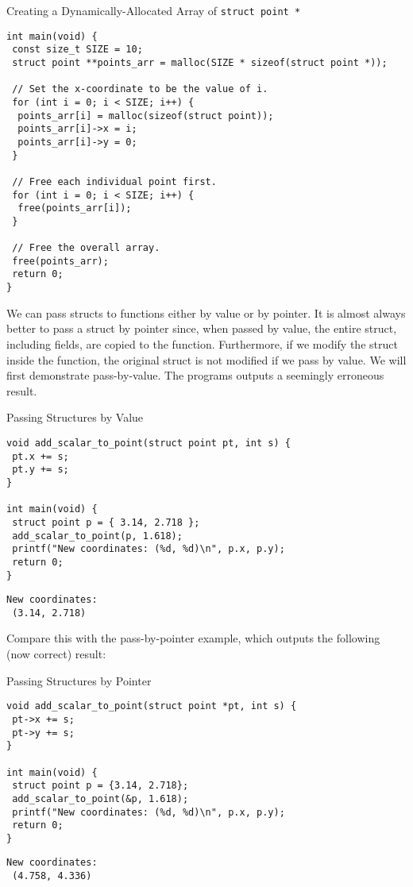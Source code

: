 \begin{cl}[main.c]{Creating a Dynamically-Allocated Array of \texttt{struct point *}}\begin{lstlisting}[language=MyC]
int main(void) {
 const size_t SIZE = 10;
 struct point **points_arr = malloc(SIZE * sizeof(struct point *));

 // Set the x-coordinate to be the value of i.
 for (int i = 0; i < SIZE; i++) {
  points_arr[i] = malloc(sizeof(struct point));
  points_arr[i]->x = i;
  points_arr[i]->y = 0;
 }
    
 // Free each individual point first.
 for (int i = 0; i < SIZE; i++) {
  free(points_arr[i]);
 }
    
 // Free the overall array.
 free(points_arr);
 return 0;
}
\end{lstlisting}\end{cl}

We can pass structs to functions either by value or by pointer. It is almost always better to pass a struct by pointer since, when passed by value, the entire struct, including fields, are copied to the function. Furthermore, if we modify the struct inside the function, the original struct is not modified if we pass by value. We will first demonstrate pass-by-value. The programs outputs a seemingly erroneous result.

\begin{clo}[main.c]{Passing Structures by Value}\begin{lstlisting}[language=MyC]
void add_scalar_to_point(struct point pt, int s) {
 pt.x += s;
 pt.y += s;
}

int main(void) {
 struct point p = { 3.14, 2.718 };
 add_scalar_to_point(p, 1.618);
 printf("New coordinates: (%d, %d)\n", p.x, p.y);
 return 0;
}
\end{lstlisting}
\tcblower
\begin{lstlisting}[language=MyOutput]
New coordinates: 
 (3.14, 2.718)
\end{lstlisting}
\end{clo}

Compare this with the pass-by-pointer example, which outputs the following (now correct) result:

\begin{clo}[main.c]{Passing Structures by Pointer}\begin{lstlisting}[language=MyC]
void add_scalar_to_point(struct point *pt, int s) {
 pt->x += s;
 pt->y += s;
}

int main(void) {
 struct point p = {3.14, 2.718};
 add_scalar_to_point(&p, 1.618);
 printf("New coordinates: (%d, %d)\n", p.x, p.y);
 return 0;
}
\end{lstlisting}
\tcblower
\begin{lstlisting}[language=MyOutput]
New coordinates: 
 (4.758, 4.336)
\end{lstlisting}
\end{clo}


